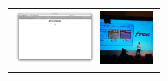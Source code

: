 \documentclass{acm_proc_article-sp}
\newcommand{\thumbheight}{14mm}
\newenvironment{thumbsequence}{}{\makebox[4mm]{}}
\begin{document}
\begin{figure}
\begin{tabular}{p{\textwidth}}
\begin{thumbsequence}
		\includegraphics[height=\thumbheight]{resources/free/looseduplicate2.png}
	\end{thumbsequence}
	\begin{thumbsequence}
		\includegraphics[height=\thumbheight]{resources/free/looseduplicate7.jpg}

\end{thumbsequence}
\end{tabular}
\end{figure}
\end{document}
